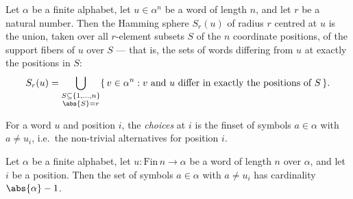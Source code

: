 \begin{lemma}
\label{CommunicationComplexity.hammingSphere_eq_biUnion}
\leanok
{}
Let $\alpha$ be a finite alphabet, let $u \in \alpha^n$ be a word of length $n$, and let
$r$ be a natural number. Then the Hamming sphere $S_r(u)$ of radius $r$ centred at $u$
is the union, taken over all $r$-element subsets $S$ of the $n$ coordinate positions, of
the support fibers of $u$ over $S$ — that is, the sets of words differing from $u$ at
exactly the positions in $S$:
\[
S_r(u) = \bigcup_{\substack{S \subseteq \{1,\dots,n\} \\ \abs{S} = r}} \{\, v \in
\alpha^n : v \text{ and } u \text{ differ in exactly the positions of } S \,\}.
\]
\end{lemma}

\begin{definition}
\label{CommunicationComplexity.choices}
\leanok
{}
For a word $u$ and position $i$, the \emph{choices} at $i$ is the finset of symbols
$a \in \alpha$ with $a \ne u_i$, i.e.\ the non-trivial alternatives for position $i$.
\end{definition}

\begin{lemma}
\label{CommunicationComplexity.choices_card}
\leanok
{}
Let $\alpha$ be a finite alphabet, let $u \colon \mathrm{Fin}\,n \to \alpha$ be a word
of length $n$ over $\alpha$, and let $i$ be a position. Then the set of symbols $a \in
\alpha$ with $a \ne u_i$ has cardinality $\abs{\alpha} - 1$.
\end{lemma}

